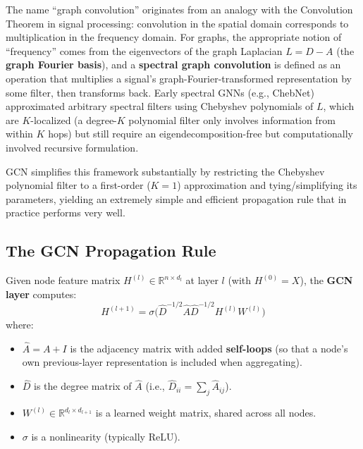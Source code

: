 \documentclass[12pt,a4paper]{article}
\begin{document}
\begin{keyidea}
The name ``graph convolution'' originates from an analogy with the Convolution Theorem in signal processing: convolution in the spatial domain corresponds to multiplication in the frequency domain. For graphs, the appropriate notion of ``frequency'' comes from the eigenvectors of the graph Laplacian $L = D - A$ (the \textbf{graph Fourier basis}), and a \textbf{spectral graph convolution} is defined as an operation that multiplies a signal's graph-Fourier-transformed representation by some filter, then transforms back. Early spectral GNNs (e.g., ChebNet) approximated arbitrary spectral filters using Chebyshev polynomials of $L$, which are $K$-localized (a degree-$K$ polynomial filter only involves information from within $K$ hops) but still require an eigendecomposition-free but computationally involved recursive formulation.
\end{keyidea}

GCN simplifies this framework substantially by restricting the Chebyshev polynomial filter to a first-order ($K=1$) approximation and tying/simplifying its parameters, yielding an extremely simple and efficient propagation rule that in practice performs very well.

\subsection{The GCN Propagation Rule}

\begin{defbox}
Given node feature matrix $H^{(l)} \in \mathbb{R}^{n \times d_l}$ at layer $l$ (with $H^{(0)} = X$), the \textbf{GCN layer} computes:
\[
H^{(l+1)} = \sigma\Big(\hat{D}^{-1/2} \hat{A} \hat{D}^{-1/2} H^{(l)} W^{(l)}\Big)
\]
where:
\begin{itemize}[leftmargin=1.5em]
    \item $\hat{A} = A + I$ is the adjacency matrix with added \textbf{self-loops} (so that a node's own previous-layer representation is included when aggregating).
    \item $\hat{D}$ is the degree matrix of $\hat{A}$ (i.e., $\hat{D}_{ii} = \sum_j \hat{A}_{ij}$).
    \item $W^{(l)} \in \mathbb{R}^{d_l \times d_{l+1}}$ is a learned weight matrix, shared across all nodes.
    \item $\sigma$ is a nonlinearity (typically ReLU).
\end{itemize}
\end{defbox}
\end{document}
